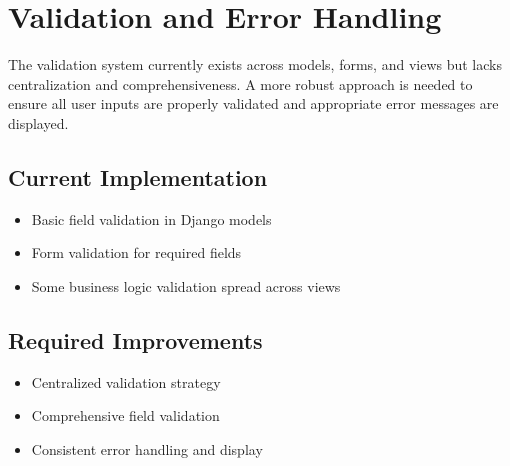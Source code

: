 \documentclass[11pt,a4paper]{report}
\newenvironment{status}[2][]{
    \begin{tcolorbox}[
        enhanced,
        attach boxed title to top center={yshift=-3mm},
        colback=white,
        colframe=#1!30,
        colbacktitle=#1!30,
        title=Status: #2,
        fonttitle=\bfseries
    ]
}{
    \end{tcolorbox}
}
\begin{document}
\section{Validation and Error Handling}
\begin{status}[warning]{70\% Complete}
The validation system currently exists across models, forms, and views but lacks centralization and comprehensiveness. A more robust approach is needed to ensure all user inputs are properly validated and appropriate error messages are displayed.

\subsection*{Current Implementation}
\begin{itemize}
    \item Basic field validation in Django models
    \item Form validation for required fields
    \item Some business logic validation spread across views
\end{itemize}

\subsection*{Required Improvements}
\begin{itemize}
    \item Centralized validation strategy
    \item Comprehensive field validation
    \item Consistent error handling and display
\end{itemize}
\end{status}

\end{document}
